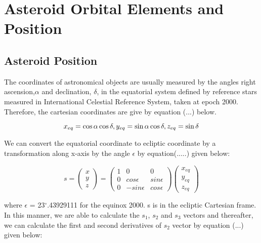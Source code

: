 \documentclass[letterpaper,12pt]{article}
\begin{document}
\section{Asteroid Orbital Elements and Position}
\subsection{Asteroid Position}
The coordinates of astronomical objects are usually measured by the angles right ascension,\begin{math}\alpha \end{math} and declination, \begin{math} \delta \end{math}, in the equatorial system defined by reference stars measured in International Celestial Reference System, taken at epoch 2000. Therefore, the cartesian coordinates are give by equation (...) below.

\begin{equation}
x_{eq}=\cos\alpha \cos\delta, \\ 
y_{eq}=\sin\alpha \cos\delta , \\ 
z_{eq}=\sin\delta
\end{equation}

We can convert the equatorial coordinate to ecliptic coordinate by a transformation along x-axis by the angle \begin{math} \epsilon \end{math} by equation(.....) given below:

\begin{equation}
s=
\begin{pmatrix}
  x \\
  y \\
  z
 \end{pmatrix} 
  =
\begin{pmatrix}
1 & 0 & 0 \\ 
 0 & cos\epsilon & sin\epsilon\\ 
 0 & -sin\epsilon & cos\epsilon
\end{pmatrix}
\begin{pmatrix}
  x_{eq} \\
  y_{eq} \\
  z_{eq}
\end{pmatrix} 
\end{equation}

where \begin{math}\epsilon\end{math} = 23\begin{math} ^{\circ} \end{math}.43929111 for the equinox 2000. s is in the ecliptic Cartesian frame.
In this manner, we are able to calculate the \begin{math}s_{1}\end{math}, \begin{math}s_{2}\end{math} and \begin{math}s_{3}\end{math} vectors and thereafter, we can calculate the first and second derivatives of \begin{math} s_{2} \end{math} vector by equation (...) given below:
\end{document}

